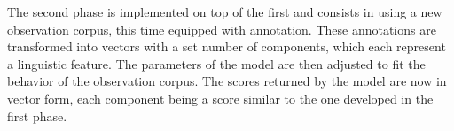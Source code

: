 The second phase is implemented on top of the first and consists in
using a new observation corpus, this time equipped with
annotation. These annotations are transformed into vectors with a set
number of components, which each represent a linguistic feature. The
parameters of the model are then adjusted to fit the behavior of the
observation corpus. The scores returned by the model are now in vector
form, each component being a score similar to the one developed in the
first phase.





